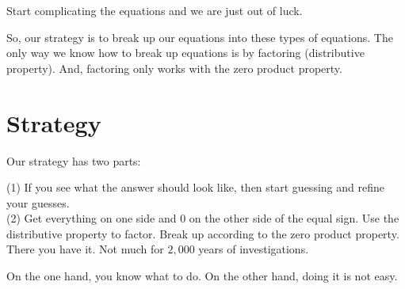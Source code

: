 \documentclass{ximera}
\begin{document}
Start complicating the equations and we are just out of luck.


So, our strategy is to break up our equations into these types of equations.  The only way we know how to break up equations is by factoring (distributive property).  And, factoring only works with the zero product property.



\section{Strategy}


Our strategy has two parts:


(1) If you see what the answer should look like, then start guessing and refine your guesses.\\
(2) Get everything on one side and $0$ on the other side of the equal sign. Use the distributive property to factor.  Break up according to the zero product property. \\




There you have it. Not much for $2,000$ years of investigations.

On the one hand, you know what to do.  On the other hand, doing it is not easy.
\end{document}
